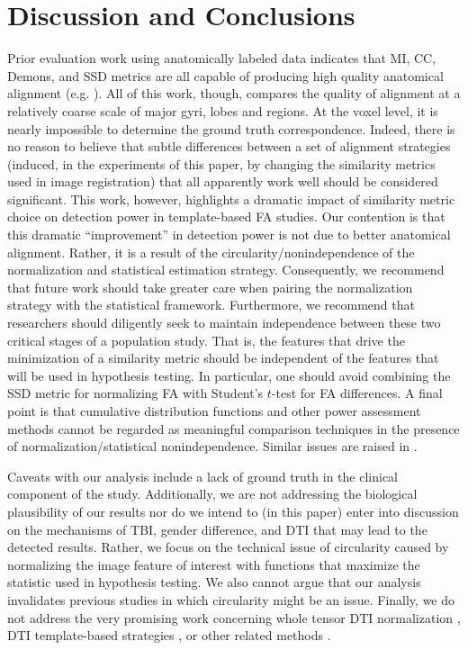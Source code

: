 \documentclass[final,5p,times,twocolumn]{elsarticle}
\begin{document}
\section{Discussion and Conclusions} 
Prior evaluation work using anatomically labeled
data indicates that MI, CC, Demons, and
SSD metrics are all capable of producing high quality anatomical
alignment (e.g. \citep{Klein2009}).  All of this work, though, compares
the quality of alignment at a relatively coarse scale of major gyri,
lobes and regions.  At the voxel level, it is nearly impossible to
determine the ground truth correspondence.  Indeed, there is no reason
to believe that subtle differences between a set of alignment
strategies (induced, in the experiments of this paper, by changing the
similarity metrics used in image registration) that all apparently
work well should be considered significant.  This work, however,
highlights a dramatic impact of similarity metric choice on detection
power in template-based FA studies.  Our contention is that this
dramatic ``improvement'' in detection power is not due to better
anatomical alignment.  Rather, it is a result of the
circularity/nonindependence of the normalization and statistical
estimation strategy.  Consequently, we recommend that future work
should take greater care when pairing the normalization strategy with
the statistical framework.  Furthermore, we recommend that researchers
should diligently seek to maintain independence between these two
critical stages of a population study.  That is, the features that
drive the minimization of a similarity metric should be independent of
the features that will be used in hypothesis testing.  In particular,
one should avoid combining the SSD metric for normalizing FA with
Student's $t$-test for FA differences.  A final point is that
cumulative distribution functions and other power assessment methods
cannot be regarded as meaningful comparison techniques in the presence
of normalization/statistical nonindependence.  Similar issues are
raised in \cite{Kriegeskorte2010}.

Caveats with our analysis include a lack of ground truth in the
clinical component of the study.   Additionally, we are not addressing
the biological plausibility of our results nor do we
intend to (in this paper) enter into discussion on the mechanisms of
TBI, gender difference, and DTI that may lead to the detected results.
Rather, we focus on the technical issue of circularity caused by
normalizing the image feature of interest with functions that maximize
the statistic used in hypothesis testing.  We also cannot argue that our analysis
invalidates previous studies in which circularity might be an issue.  
Finally, we do not address the very promising work concerning
whole tensor DTI normalization \citep{Zhang2007,Hecke2007}, DTI template-based
strategies \citep{Mori2009,Hecke2011}, or other related methods \cite{jbabdi2010}.  
\end{document}
